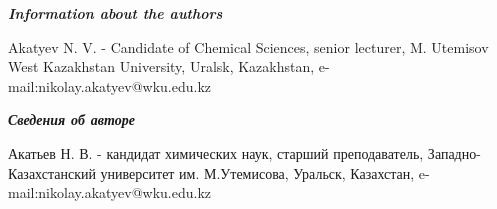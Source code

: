 \emph{{\bfseries Information about the authors}}

Akatyev N. V. - Candidate of Chemical Sciences, senior lecturer, M.
Utemisov West Kazakhstan University, Uralsk, Kazakhstan,
e-mail:nikolay.akatyev@wku.edu.kz

\emph{{\bfseries Сведения об авторе}}

Акатьев Н. В. - кандидат химических наук, старший преподаватель,
Западно-Казахстанский университет им. М.Утемисова, Уральск, Казахстан,
e-mail:nikolay.akatyev@wku.edu.kz

